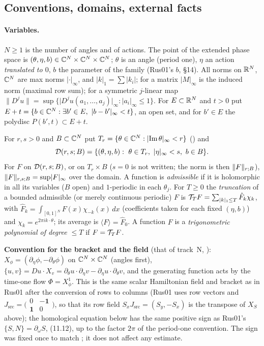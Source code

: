\subsection{Conventions, domains, external facts}\label{bpP:p11a:c2-conv}

\paragraph{Variables.} $N\ge1$ is the number of angles and of actions. The point of the extended phase space is $(\theta,\eta,b)\in\mathbb{C}^N\times\mathbb{C}^N\times\mathbb{C}^N$; $\theta$ is an angle (period one), $\eta$ an action \emph{translated to $0$}, $b$ the parameter of the family (Rus01's $b$, \S14). All norms on $\mathbb{R}^N$, $\mathbb{C}^N$ are max norms $\lvert\cdot\rvert_\infty$, and $\lvert k\rvert_1=\sum\lvert k_i\rvert$; for a matrix $\lvert M\rvert_\infty$ is the induced norm (maximal row sum); for a symmetric $j$-linear map $\lVert D^ju\rVert=\sup\{\lvert D^ju(a_1,\dots,a_j)\rvert_\infty:\lvert a_i\rvert_\infty\le1\}$. For $E\subset\mathbb{R}^N$ and $t>0$ put $E+t=\{b\in\mathbb{C}^N:\exists b'\in E,\ \lvert b-b'\rvert_\infty<t\}$, an open set, and for $b'\in E$ the polydisc $P(b',t)\subset E+t$.
\begin{definition}\label{bpP:p11a:domain-def}
For $r,s>0$ and $B\subset\mathbb{C}^N$ put $T_r=\{\theta\in\mathbb{C}^N:\lvert\operatorname{Im}\theta\rvert_\infty<r\}$ () and
\[\Dd rsB=\{(\theta,\eta,b):\ \theta\in T_r,\ \lvert\eta\rvert_\infty<s,\ b\in B\}.\]
For $F$ on $\mathcal D(r,s;B)$, or on $T_r\times B$ ($s=0$ is not written; the norm is then $\lVert F\rVert_{r;B}$), $\lVert F\rVert_{r,s;B}=\sup\lvert F\rvert_\infty$ over the domain. A function is \emph{admissible} if it is holomorphic in all its variables ($B$ open) and $1$-periodic in each $\theta_j$. For $T\ge0$ the \emph{truncation} of a bounded admissible (or merely continuous periodic) $F$ is $\mathcal T_TF=\sum_{\lvert k\rvert_1\le T}\hat F_k\chi_k$, with $\hat F_k=\int_{[0,1]^N}F(x)\chi_{-k}(x)\,dx$ (coefficients taken for each fixed $(\eta,b)$) and $\chi_k=e^{2\pi ik\cdot\theta}$; its average is $\langle F\rangle=\hat F_0$. A function $F$ is a \emph{trigonometric polynomial of degree $\le T$} if $F=\mathcal T_TF$.
\end{definition}
\textbf{Convention for the bracket and the field} (that of track~N, ): $X_\phi=(\partial_\eta\phi,-\partial_\theta\phi)$ on $\mathbb{C}^N\times\mathbb{C}^N$ (angles first), $\{u,v\}=Du\cdot X_v=\partial_\theta u\cdot\partial_\eta v-\partial_\eta u\cdot\partial_\theta v$, and the generating function acts by the time-one flow $\Phi=X_\phi^1$. This is the same scalar Hamiltonian field and bracket as in Rus01 after the conversion of rows to columns (Rus01 uses row vectors and $J_{\mathrm{src}}=\bigl(\begin{smallmatrix}0&-\mathbf 1\\ \mathbf 1&0\end{smallmatrix}\bigr)$, so that its row field $S_xJ_{\mathrm{src}}=(S_y,-S_x)$ is the transpose of $X_S$ above); the homological equation below has the same positive sign as Rus01's $\{S,N\}=\partial_\omega S$, (11.12), up to the factor $2\pi$ of the period-one convention. The sign was fixed once to match ; it does not affect any estimate.

